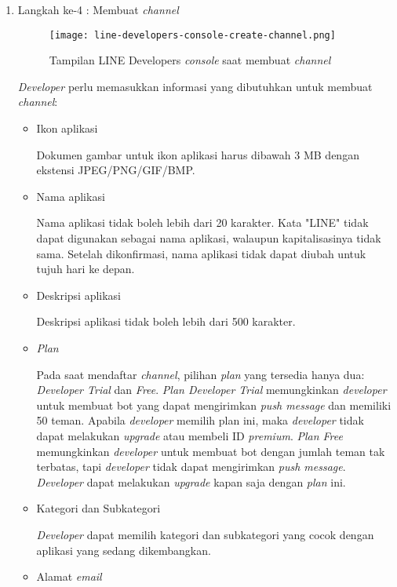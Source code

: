 \begin{enumerate}
\item Langkah ke-4 : Membuat \textit{channel}
\begin{figure}[H]
	\centering  
	\texttt{[image: line-developers-console-create-channel.png]}  
	\caption[Tampilan LINE Developers \textit{console} saat membuat \textit{channel}]{Tampilan LINE Developers \textit{console} saat membuat \textit{channel}} 
	\label{fig:line-developers-console-create-channel} 
\end{figure}

\textit{Developer} perlu memasukkan informasi yang dibutuhkan untuk membuat \textit{channel}:
\begin{itemize}
\item Ikon aplikasi

Dokumen gambar untuk ikon aplikasi harus dibawah 3 MB dengan ekstensi JPEG/PNG/GIF/BMP.

\item Nama aplikasi

Nama aplikasi tidak boleh lebih dari 20 karakter. Kata "LINE" tidak dapat digunakan sebagai nama aplikasi, walaupun kapitalisasinya tidak sama. Setelah dikonfirmasi, nama aplikasi tidak dapat diubah untuk tujuh hari ke depan.

\item Deskripsi aplikasi

Deskripsi aplikasi tidak boleh lebih dari 500 karakter.

\item \textit{Plan}

Pada saat mendaftar \textit{channel}, pilihan \textit{plan} yang tersedia hanya dua: \textit{Developer Trial} dan \textit{Free}. \textit{Plan Developer Trial} memungkinkan \textit{developer} untuk membuat bot yang dapat mengirimkan \textit{push message} dan memiliki 50 teman. Apabila \textit{developer} memilih plan ini, maka \textit{developer} tidak dapat melakukan \textit{upgrade} atau membeli ID \textit{premium}. \textit{Plan Free} memungkinkan \textit{developer} untuk membuat bot dengan jumlah teman tak terbatas, tapi \textit{developer} tidak dapat mengirimkan \textit{push message}. \textit{Developer} dapat melakukan \textit{upgrade} kapan saja dengan \textit{plan} ini.

\item Kategori dan Subkategori

\textit{Developer} dapat memilih kategori dan subkategori yang cocok dengan aplikasi yang sedang dikembangkan.

\item Alamat \textit{email}


\end{itemize}
\end{enumerate}
